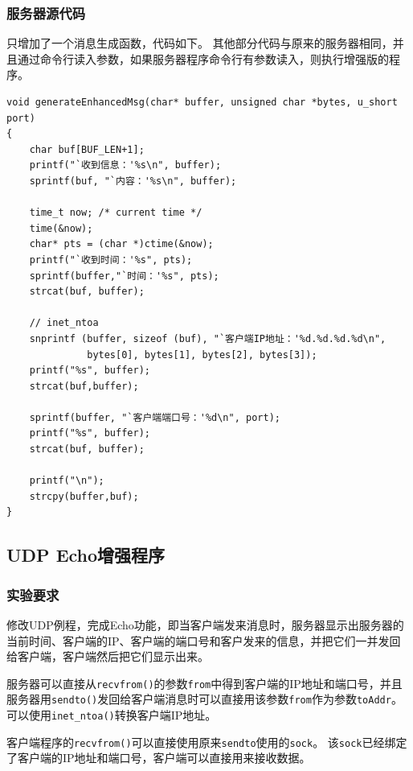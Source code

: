 \documentclass[logo,reportComp]{thesis}
\begin{document}
\subsubsection{服务器源代码}
只增加了一个消息生成函数，代码如下。
其他部分代码与原来的服务器相同，并且通过命令行读入参数，如果服务器程序命令行有参数读入，则执行增强版的程序。
\begin{lstlisting}
void generateEnhancedMsg(char* buffer, unsigned char *bytes, u_short port)
{
    char buf[BUF_LEN+1];
    printf("`收到信息：'%s\n", buffer);
    sprintf(buf, "`内容：'%s\n", buffer);

    time_t now; /* current time */
    time(&now);
    char* pts = (char *)ctime(&now);
    printf("`收到时间：'%s", pts);
    sprintf(buffer,"`时间：'%s", pts);
    strcat(buf, buffer);

    // inet_ntoa
    snprintf (buffer, sizeof (buf), "`客户端IP地址：'%d.%d.%d.%d\n",
              bytes[0], bytes[1], bytes[2], bytes[3]);
    printf("%s", buffer);
    strcat(buf,buffer);

    sprintf(buffer, "`客户端端口号：'%d\n", port);
    printf("%s", buffer);
    strcat(buf, buffer);

    printf("\n");
    strcpy(buffer,buf);
}
\end{lstlisting}


\subsection{UDP Echo增强程序}
\subsubsection{实验要求}
修改UDP例程，完成Echo功能，即当客户端发来消息时，服务器显示出服务器的当前时间、客户端的IP、客户端的端口号和客户发来的信息，并把它们一并发回给客户端，客户端然后把它们显示出来。

服务器可以直接从\verb'recvfrom()'的参数\verb'from'中得到客户端的IP地址和端口号，并且服务器用\verb'sendto()'发回给客户端消息时可以直接用该参数\verb'from'作为参数\verb'toAddr'。
可以使用\verb'inet_ntoa()'转换客户端IP地址。

客户端程序的\verb'recvfrom()'可以直接使用原来\verb'sendto'使用的\verb'sock'。
该\verb'sock'已经绑定了客户端的IP地址和端口号，客户端可以直接用来接收数据。
\end{document}
